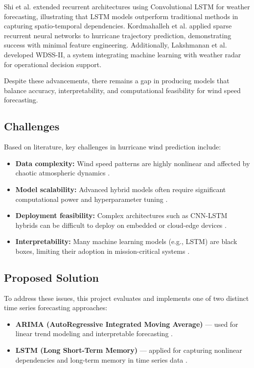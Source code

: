 Shi et al. \cite{shi2015convolutional} extended recurrent architectures using Convolutional LSTM for weather forecasting, illustrating that LSTM models outperform traditional methods in capturing spatio-temporal dependencies. Kordmahalleh et al. \cite{kordmahalleh2016hurricane} applied sparse recurrent neural networks to hurricane trajectory prediction, demonstrating success with minimal feature engineering. Additionally, Lakshmanan et al. \cite{lakshmanan2007wdss} developed WDSS-II, a system integrating machine learning with weather radar for operational decision support.

Despite these advancements, there remains a gap in producing models that balance accuracy, interpretability, and computational feasibility for wind speed forecasting.

\subsection{Challenges}
Based on literature, key challenges in hurricane wind prediction include:

\begin{itemize}
	\item \textbf{Data complexity:} Wind speed patterns are highly nonlinear and affected by chaotic atmospheric dynamics \cite{zhang2001forecasting}.
	\item \textbf{Model scalability:} Advanced hybrid models often require significant computational power and hyperparameter tuning \cite{su2011hurricane}.
	\item \textbf{Deployment feasibility:} Complex architectures such as CNN-LSTM hybrids can be difficult to deploy on embedded or cloud-edge devices \cite{shi2015convolutional}.
	\item \textbf{Interpretability:} Many machine learning models (e.g., LSTM) are black boxes, limiting their adoption in mission-critical systems \cite{box2015time}.
\end{itemize}

\subsection{Proposed Solution}
To address these issues, this project evaluates and implements one of two distinct time series forecasting approaches:

\begin{itemize}
	\item \textbf{ARIMA (AutoRegressive Integrated Moving Average)} — used for linear trend modeling and interpretable forecasting \cite{box2015time}.
	\item \textbf{LSTM (Long Short-Term Memory)} — applied for capturing nonlinear dependencies and long-term memory in time series data \cite{zhang2001forecasting}.
\end{itemize}

